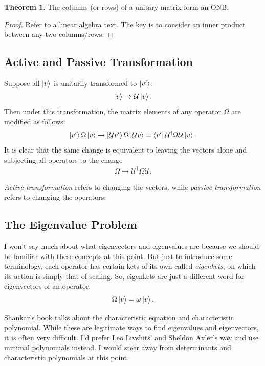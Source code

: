 \documentclass{book}
\theoremstyle{definition}
\newtheorem{thm}{Theorem}[section]
\newcommand{\U}{\mathcal{U}}
\begin{document}
\begin{thm}
	The columns (or rows) of a unitary matrix form an ONB.
	\begin{proof}
		Refer to a linear algebra text. The key is to consider an inner product between any two columns/rows.
	\end{proof}
\end{thm}


\subsection{Active and Passive Transformation}

Suppose all $\ket{v}$ is unitarily transformed to $\ket{v'}$:
\begin{align}
\ket{v} \to \U \ket{v}.
\end{align}
Then under this transformation, the matrix elements of any operator $\Omega$ are modified as follows:
\begin{align}
\ket{v'}\Omega\ket{v} \to \ket{\U v'} \Omega \ket{\U v} = \bra{v'}\U^\dagger \Omega \U \ket{v}.
\end{align}
It is clear that the same change is equivalent to leaving the vectors alone and subjecting all operators to the change
\begin{align}
\Omega \to \U^\dagger \Omega \U.
\end{align}

\textit{Active transformation} refers to changing the vectors, while \textit{passive transformation} refers to changing the operators.





\subsection{The Eigenvalue Problem}
I won't say much about what eigenvectors and eigenvalues are because we should be familiar with these concepts at this point. But just to introduce some terminology, each operator has certain kets of its own called \textit{eigenkets}, on which its action is simply that of scaling. So, eigenkets are just a different word for eigenvectors of an operator:
\begin{align}
\Omega\ket{v} = \omega\ket{v}.
\end{align}

Shankar's book talks about the characteristic equation and characteristic polynomial. While these are legitimate ways to find eigenvalues and eigenvectors, it is often very difficult. I'd prefer Leo Livshits' and Sheldon Axler's way and use minimal polynomials instead. I would steer away from determinants and characteristic polynomials at this point. 
\end{document}
